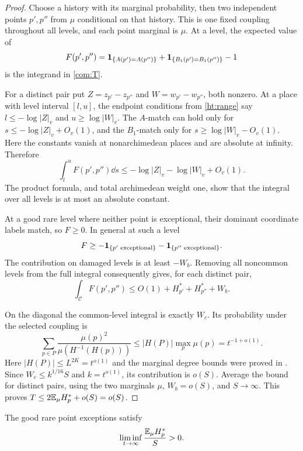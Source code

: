 \begin{proof}
Choose a history with its marginal probability, then two independent points
\(p',p''\) from \(\mu\) conditional on that history. This is one fixed
coupling throughout all levels, and each point marginal is \(\mu\). At a
level, the expected value of
\[
 F(p',p'')=
   \mathbf 1_{\{A(p')=A(p'')\}}+
   \mathbf 1_{\{B_1(p')=B_1(p'')\}}-1
\]
is the integrand in \eqref{com:T}.

For a distinct pair put \(Z=z_{p'}-z_{p''}\) and
\(W=w_{p'}-w_{p''}\), both nonzero. At a place with level interval
\([l,u]\), the endpoint conditions from \eqref{ht:range} say
\(l\le-\log|Z|_v\) and \(u\ge\log|W|_v\). The \(A\)-match can hold only
for \(s\le-\log|Z|_v+O_v(1)\), and the \(B_1\)-match only for
\(s\ge\log|W|_v-O_v(1)\). Here the constants vanish at nonarchimedean
places and are absolute at infinity. Therefore
\[
 \int_l^u F(p',p'')\dd s
 \le-\log|Z|_v-\log|W|_v+O_v(1).
\]
The product formula, and total archimedean weight one, show that the
integral over all levels is at most an absolute constant.

At a good rare level where neither point is exceptional, their dominant
coordinate labels match, so \(F\ge0\). In general at such a level
\[
 F\ge-\mathbf 1_{\{p'\text{ exceptional}\}}-
         \mathbf 1_{\{p''\text{ exceptional}\}}.
\]
The contribution on damaged levels is at least \(-W_b\). Removing all
noncommon levels from the full integral consequently gives, for each
distinct pair,
\[
 \int_{\mathcal C}F(p',p'')
       \le O(1)+H_{p'}^*+H_{p''}^*+W_b.
\]

On the diagonal the common-level integral is exactly \(W_c\). Its
probability under the selected coupling is
\[
 \sum_{p\in P}\frac{\mu(p)^2}{\mu(H^{-1}(H(p)))}
 \le |H(P)|\max_p\mu(p)=t^{-1+o(1)}.
\]
Here \(|H(P)|\le L^{2K}=t^{o(1)}\) and the marginal degree bounds were
proved in . Since
\(W_c\le k^{1/16}S\) and \(k=t^{o(1)}\), its contribution is \(o(S)\).
Average the bound for distinct pairs, using the two marginals \(\mu\),
\(W_b=o(S)\), and \(S\to\infty\). This proves
\(T\le2\mathbb E_\mu H_p^*+o(S)=o(S)\).
\end{proof}

\begin{proposition}\label{com:rare-positive}
The good rare point exceptions satisfy
\begin{equation}\label{com:rare-positive-eq}
 \liminf_{t\to\infty}\frac{\mathbb E_\mu H_p^*}{S}>0.
\end{equation}
\end{proposition}


